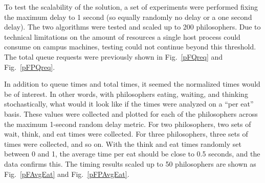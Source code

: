 \documentclass[conference,11pt]{IEEEtran}
\begin{document}
To test the scalability of the solution, a set of experiments were performed fixing the maximum delay to 1 second (so equally randomly no delay or a one second delay). The two algorithms were tested and scaled up to 200 philosophers. Due to technical limitations on the amount of resources a single host process could consume on campus machines, testing could not continue beyond this threshold. The total queue requests were previously shown in Fig.~\ref{pFQreq} and Fig.~\ref{pFPQreq}.

In addition to queue times and total times, it seemed the normalized times would be of interest. In other words, with philosophers eating, waiting, and thinking stochastically, what would it look like if the times were analyzed on a ``per eat'' basis. These values were collected and plotted for each of the philosophers across the maximum 1-second random delay metric. For two philosophers, two sets of wait, think, and eat times were collected. For three philosophers, three sets of times were collected, and so on. With the think and eat times randomly set between 0 and 1, the average time per eat should be close to 0.5 seconds, and the data confirms this. The timing results scaled up to 50 philosophers are shown as Fig.~\ref{pFAvgEat} and Fig.~\ref{pFPAvgEat}.
\end{document}

